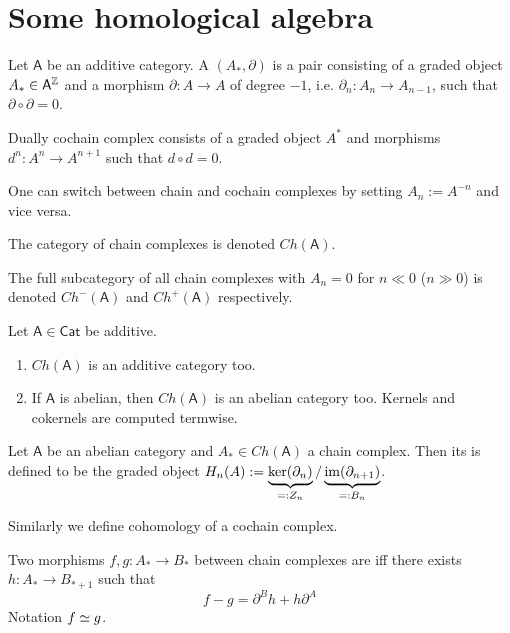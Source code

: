 \documentclass[fontsize=11pt,fleqn,a4paper]{scrartcl}
\begin{document}
\section{Some homological algebra}

\begin{definition}
Let $\mathsf{A}$ be an additive category. A  $(A_\ast,\partial)$ is a pair consisting of a graded object $A_\ast\in\mathsf{A}^{\mathbb{Z}}$ and a morphism $\partial: A\to A$ of degree $-1$, i.e. $\partial_n : A_n \to A_{n-1}$, such that $\partial\circ\partial=0$.

Dually cochain complex consists of a graded object $A^\ast$ and morphisms $d^n:A^n\to A^{n+1}$ such that $d\circ d=0$.
\end{definition}

\begin{remark}
One can switch between chain and cochain complexes by setting $A_n := A^{-n}$ and vice versa.
\end{remark}

\begin{definition}
The category of chain complexes is denoted $Ch(\mathsf{A})$.

The full subcategory of all chain complexes with $A_n = 0$ for $n\ll 0$ ($n\gg 0$) is denoted $Ch^-(\mathsf{A})$ and $Ch^+(\mathsf{A})$ respectively.
\end{definition}

\begin{lemma}
Let $\mathsf{A}\in\mathsf{Cat}$ be additive.
\begin{enumerate}
\item $Ch(\mathsf{A})$ is an additive category too.
\item If $\mathsf{A}$ is abelian, then $Ch(\mathsf{A})$ is an abelian category too. Kernels and cokernels are computed termwise.
\end{enumerate}
\end{lemma}

\begin{definition}[Homology]
Let $\mathsf{A}$ be an abelian category and $A_\ast\in Ch(\mathsf{A})$ a chain complex. Then its  is defined to be the graded object $H_n(A) := \underbrace{\ker(\partial_n)}_{=:Z_n} / \underbrace{\operatorname{im}(\partial_{n+1})}_{=:B_n}$.

Similarly we define cohomology of a cochain complex.
\end{definition}

\begin{definition}
Two morphisms $f,g: A_\ast\to B_\ast$ between chain complexes are  iff there exists $h: A_\ast \to B_{\ast+1}$ such that
\[f-g = \partial^B h + h\partial^A\]
Notation $f\simeq g$.
\end{definition}
\end{document}
